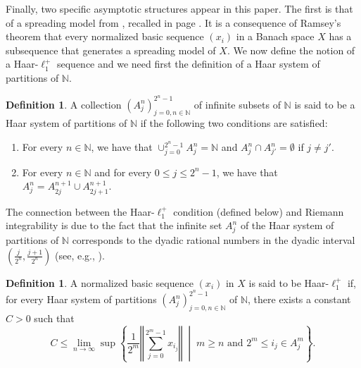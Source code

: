\documentclass[12pt,a4paper]{amsart}
\newcommand{\N}{\mathbb{N}}
\newcommand{\bes}{\begin{equation*}}
\newcommand{\ees}{\end{equation*}}
\theoremstyle{definition}
\newtheorem{definition}[question]{Definition}
\theoremstyle{plain}
\begin{document}
Finally, two specific asymptotic structures appear in this paper. The first is that of a spreading model from \cite{brunel:sucheston:1974}, recalled in page \pageref{sec1}. It is a consequence of Ramsey's theorem that every normalized basic sequence $(x_{i})$ in a Banach space $X$ has a subsequence that generates a spreading model of $X$. We now define the notion of a Haar-$\ell_{1}^{+}$ sequence and we need first the definition of a Haar system of partitions of $\N$.

\begin{definition}{\label{Haar_system}}
A collection $(A^{n}_{j})_{j=0,n\in\N}^{2^{n}-1}$ of infinite subsets of $\N$ is said to be a Haar system of partitions of $\N$ if the following two conditions are satisfied:
\begin{enumerate}
\item For every $n\in\N$, we have that $\cup_{j=0}^{2^{n}-1}A^{n}_{j}=\N$ and $A^{n}_{j}\cap A^{n}_{j'}=\emptyset$ if $j\neq j'$.
\item For every $n\in\N$ and for every $0\leq j\leq 2^{n}-1$, we have that $A^{n}_{j}= A^{n+1}_{2j}\cup A^{n+1}_{2j+1}$.
\end{enumerate}
\end{definition}

The connection between the Haar-$\ell_{1}^{+}$ condition (defined below) and Riemann integrability is due to the fact that the infinite set $A^{n}_{j}$ of the Haar system of partitions of $\N$ corresponds to the dyadic rational numbers in the dyadic interval $\left(\frac{j}{2^{n}},\frac{j+1}{2^{n}}\right)$ (see, e.g., \cite[Theorem 3.1]{gaebler:sari:2023}).



\begin{definition}{\label{Haar-l1+}}
A normalized basic sequence $(x_{i})$ in $X$ is said to be Haar-$\ell_{1}^{+}$ if, for every Haar system of partitions $(A^{n}_{j})_{j=0,n\in\N}^{2^{n}-1}$ of $\N$, there exists a constant $C>0$ such that
\bes C\leq \lim_{n\to\infty}\sup\left\{ \frac{1}{2^{m}}\left\Vert \sum_{j=0}^{2^{m}-1}x_{i_{j}}\right\Vert \;\middle\vert\; m\geq n \text{ and } 2^{m}\leq i_{j}\in A^{m}_{j}\right\}.\ees
\end{definition}
\end{document}

